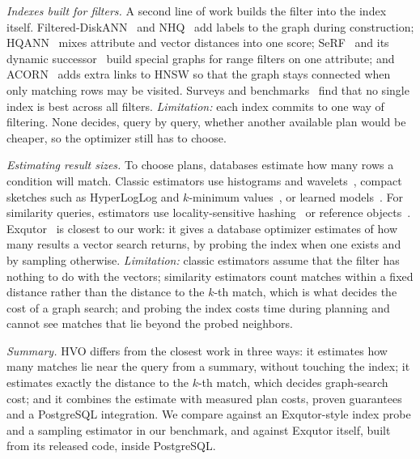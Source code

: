 \documentclass[sigconf, nonacm]{acmart}
\begin{document}
\emph{Indexes built for filters.} A second line of work builds the filter into the index itself. Filtered-DiskANN~\cite{gollapudi2023filtereddiskann} and NHQ~\cite{wang2022nhq} add labels to the graph during construction; HQANN~\cite{wu2022hqann} mixes attribute and vector distances into one score; SeRF~\cite{zuo2024serf} and its dynamic successor~\cite{peng2025drfanns} build special graphs for range filters on one attribute; and ACORN~\cite{patel2024acorn} adds extra links to HNSW so that the graph stays connected when only matching rows may be visited. Surveys and benchmarks~\cite{lin2025survey,iff2025benchmark,shi2025unified,amanbayev2026fanns} find that no single index is best across all filters. \emph{Limitation:} each index commits to one way of filtering. None decides, query by query, whether another available plan would be cheaper, so the optimizer still has to choose.

\emph{Estimating result sizes.} To choose plans, databases estimate how many rows a condition will match. Classic estimators use histograms and wavelets~\cite{matias1998wavelet,gunopulos2000approximating}, compact sketches such as HyperLogLog and $k$-minimum values~\cite{flajolet2007hll,beyer2007kmv}, or learned models~\cite{kipf2019mscn,yang2020neurocard,hilprecht2020deepdb}. For similarity queries, estimators use locality-sensitive hashing~\cite{charikar2002similarity,spring2017new} or reference objects~\cite{lan2024cardinality}. Exqutor~\cite{exqutor2026} is closest to our work: it gives a database optimizer estimates of how many results a vector search returns, by probing the index when one exists and by sampling otherwise. \emph{Limitation:} classic estimators assume that the filter has nothing to do with the vectors; similarity estimators count matches within a fixed distance rather than the distance to the $k$-th match, which is what decides the cost of a graph search; and probing the index costs time during planning and cannot see matches that lie beyond the probed neighbors.

\emph{Summary.} HVO differs from the closest work in three ways: it estimates how many matches lie near the query from a summary, without touching the index; it estimates exactly the distance to the $k$-th match, which decides graph-search cost; and it combines the estimate with measured plan costs, proven guarantees and a PostgreSQL integration. We compare against an Exqutor-style index probe and a sampling estimator in our benchmark, and against Exqutor itself, built from its released code, inside PostgreSQL.
\end{document}
